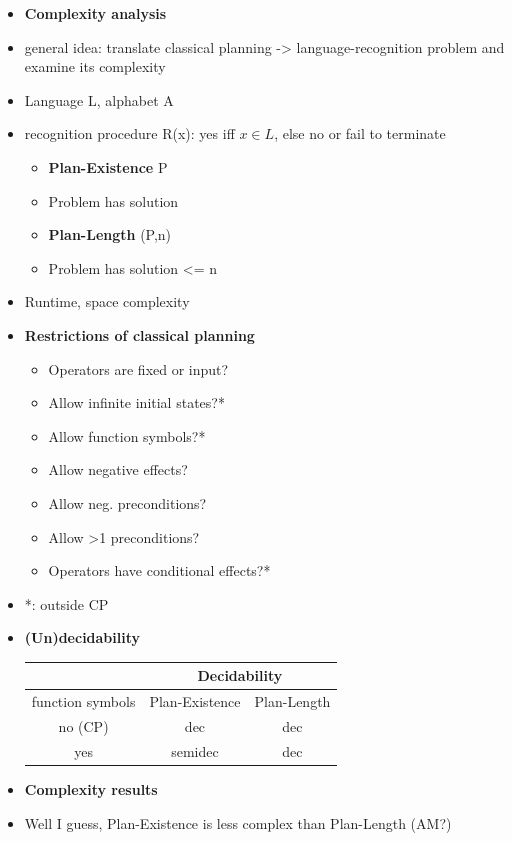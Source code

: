 \begin{itemize}
\item \textbf{Complexity analysis}
\item general idea: translate classical planning -> language-recognition problem and examine its complexity
\item Language L, alphabet A
\item recognition procedure R(x): yes iff $x \in L$, else no or fail to terminate

	\begin{itemize}
	\item \textbf{Plan-Existence} P
	\item Problem has solution
	\item \textbf{Plan-Length} (P,n)
	\item Problem has solution <= n
	\end{itemize}

\item Runtime, space complexity

\item \textbf{Restrictions of classical planning}
\begin{itemize}
	\item Operators are fixed or input?
	\item Allow infinite initial states?*	
	\item Allow function symbols?*
	\item Allow negative effects?
	\item Allow neg. preconditions?
	\item Allow >1 preconditions?
	\item Operators have conditional effects?*
\end{itemize}

\item *: outside CP

\item \textbf{(Un)decidability}

\begin{tabular}{|c|c|c|}
\hline 
& \multicolumn{2}{c|}{Decidability} \\ 
\hline 
function symbols & Plan-Existence &Plan-Length \\ 
\hline 
no (CP) & dec & dec \\ 
\hline 
yes & semidec & dec \\ 
\hline 
\end{tabular} 


\item \textbf{Complexity results}
\item Well I guess, Plan-Existence is less complex than Plan-Length (AM?)


\end{itemize}
